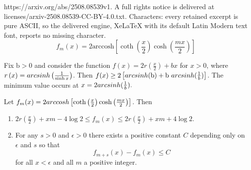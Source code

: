 \documentclass[10pt,a4paper]{amsart}
\begin{document}
https://arxiv.org/abs/2508.08539v1. A full rights notice is delivered at licenses/arxiv-2508.08539-CC-BY-4.0.txt. Characters: every retained excerpt is pure ASCII, so the delivered engine, XeLaTeX with its default Latin Modern text font, reports no missing character.
\begin{equation}\label{eq: collar winding function}
    f_m (x) = 2\text{arccosh}\left[\coth \left(\frac{x}{2}\right)  \cosh \left(\frac{mx}{2} \right)\right]
\end{equation}

\begin{lem} \label{lem: calculus}
 Fix $\text{b} >0$ and 
consider the function $f(x)=2 r\left(\frac{x}{2}\right)  +bx$ for $x >0$, 
where $ r\left(x\right)=\textup{arcsinh}\left(\frac{1}{\sinh x}\right)$.
Then $f(x) \geq 2 \left[\textup{arcsinh}(\text{b})+\text{b } \textup{arcsinh}(\frac{1}{b})                 \right]$. The  minimum value occurs at $x=2\textup{arcsinh}(\frac{1}{b}).$
\end{lem} %

\begin{lem} \label{lem: difference bounded} 

Let 
$f_{m}(x)=
 2\textup{arccosh}\left[\coth \left(\frac{x}{2}\right)  \cosh \left(\frac{mx}{2} \right)\right]$.  Then


\begin{enumerate}
\item   
$
2 r(\frac{x}{2})+xm-4\log 2 \leq f_{m}(x)
\leq    2r(\frac{x}{2})+xm+4\log 2$.

\item 
For any $s>0$  and $\epsilon >0$ there exists a positive constant $C$ depending only on $\epsilon$ and $s$ so that  
  $$ f_{m+s}(x)- f_{m}(x) \leq  C$$
  for all $x <\epsilon$ and all $m$ a positive integer.
  
  \end{enumerate}
\end{lem}
\end{document}
